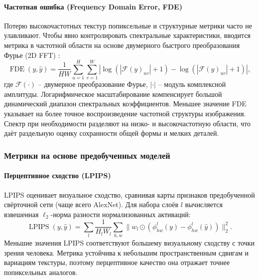 \paragraph{Частотная ошибка (Frequency Domain Error, FDE)}
Потерю высокочастотных текстур попиксельные и структурные метрики часто не улавливают.
Чтобы явно контролировать спектральные характеристики, вводится метрика в частотной области на основе двумерного быстрого преобразования Фурье (2D FFT) \cite{cai2021frequency}:
\begin{equation}
\operatorname{FDE}(y, \hat{y}) = \frac{1}{HW} \sum_{u=1}^{H} \sum_{v=1}^{W} \left| \log\left(|\mathcal{F}(y)_{uv}| + 1\right) - \log\left(|\mathcal{F}(\hat{y})_{uv}| + 1\right) \right|,
\label{eq:fde}
\end{equation}
где $\mathcal{F}(\cdot)$ -- двумерное преобразование Фурье, $|\cdot|$ -- модуль комплексной амплитуды. Логарифмическое масштабирование компенсирует большой динамический диапазон спектральных коэффициентов. Меньшее значение FDE указывает на более точное воспроизведение частотной структуры изображения. Спектр при необходимости разделяют на низко- и высокочастотную области, что даёт раздельную оценку сохранности общей формы и мелких деталей.

\subsubsection{Метрики на основе предобученных моделей}

\paragraph{Перцептивное сходство (LPIPS)}
LPIPS \cite{zhang2018unreasonable} оценивает визуальное сходство, сравнивая карты признаков предобученной свёрточной сети (чаще всего AlexNet).
Для набора слоёв $l$ вычисляется взвешенная $\ell_2$-норма разности нормализованных активаций:
\begin{equation}
\operatorname{LPIPS}(y, \hat{y}) = \sum_l \frac{1}{H_l W_l} \sum_{h,w} \bigl\| w_l \odot (\phi_{hw}^l(y) - \phi_{hw}^l(\hat{y})) \bigr\|_2^2.
\label{eq:lpips}
\end{equation}
Меньшие значения LPIPS соответствуют большему визуальному сходству с точки зрения человека.
Метрика устойчива к небольшим пространственным сдвигам и вариациям текстуры, поэтому перцептивное качество она отражает точнее попиксельных аналогов.

